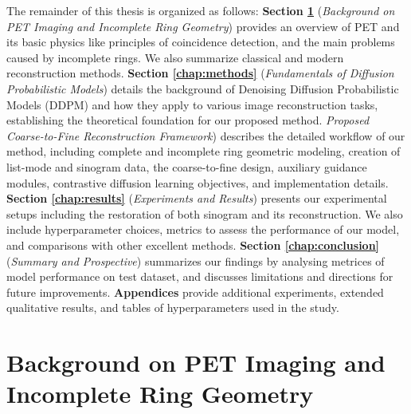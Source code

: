 \documentclass[
reprint,
superscriptaddress,
nofootinbib,
amsmath,amssymb,
aps,
prd,
]{revtex4-2}
\begin{document}
The remainder of this thesis is organized as follows:
\textbf{Section \ref{chap:background}} (\emph{Background on PET Imaging and Incomplete Ring Geometry}) provides an overview of PET and its basic physics like principles of coincidence detection, and the main problems caused by incomplete rings. We also summarize classical and modern reconstruction methods.
\textbf{Section \ref{chap:methods}} (\emph{Fundamentals of Diffusion Probabilistic Models}) details the background of Denoising Diffusion Probabilistic Models (DDPM) and how they apply to various image reconstruction tasks, establishing the theoretical foundation for our proposed method. \emph{Proposed Coarse-to-Fine Reconstruction Framework}) describes the detailed workflow of our method, including complete and incomplete ring geometric modeling, creation of list-mode and sinogram data, the coarse-to-fine design, auxiliary guidance modules, contrastive diffusion learning objectives, and implementation details.
\textbf{Section \ref{chap:results}} (\emph{Experiments and Results}) presents our experimental setups including the restoration of both sinogram and its reconstruction. We also include hyperparameter choices, metrics to assess the performance of our model, and comparisons with other excellent methods. 
\textbf{Section \ref{chap:conclusion}} (\emph{Summary and Prospective}) summarizes our findings by analysing metrices of model performance on test dataset, and discusses limitations and directions for future improvements.
\textbf{Appendices} provide additional experiments, extended qualitative results, and tables of hyperparameters used in the study.




\section{Background on PET Imaging and Incomplete Ring Geometry}

\label{chap:background}


\end{document}

